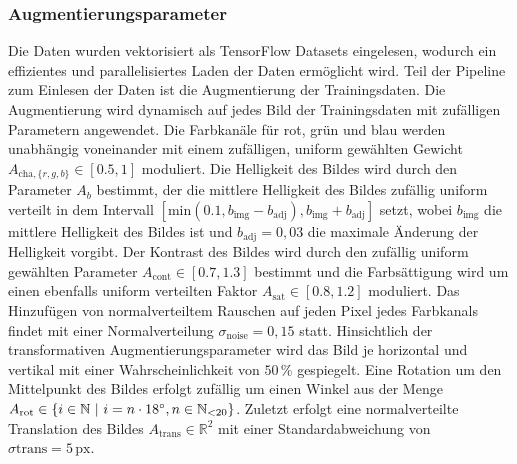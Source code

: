 \subsubsection{Augmentierungsparameter}

Die Daten wurden vektorisiert als TensorFlow Datasets eingelesen, wodurch ein effizientes und parallelisiertes Laden der Daten ermöglicht wird. Teil der Pipeline zum Einlesen der Daten ist die Augmentierung der Trainingsdaten. Die Augmentierung wird dynamisch auf jedes Bild der Trainingsdaten mit zufälligen Parametern angewendet. Die Farbkanäle für rot, grün und blau werden unabhängig voneinander mit einem zufälligen, uniform gewählten Gewicht $A_{\text{cha}, \{r,g,b\}} \in [0.5, 1]$ moduliert. Die Helligkeit des Bildes wird durch den Parameter $A_b$ bestimmt, der die mittlere Helligkeit des Bildes zufällig uniform verteilt in dem Intervall $[\text{min}(0.1, b_\text{img}-b_\text{adj}), b_\text{img} + b_\text{adj}]$ setzt, wobei $b_\text{img}$ die mittlere Helligkeit des Bildes ist und $b_\text{adj} = 0,03$ die maximale Änderung der Helligkeit vorgibt. Der Kontrast des Bildes wird durch den zufällig uniform gewählten Parameter $A_\text{cont} \in [0.7, 1.3]$ bestimmt und die Farbsättigung wird um einen ebenfalls uniform verteilten Faktor $A_\text{sat} \in [0.8, 1.2]$ moduliert. Das Hinzufügen von normalverteiltem Rauschen auf jeden Pixel jedes Farbkanals findet mit einer Normalverteilung $\sigma_\text{noise} = 0,15$ statt. Hinsichtlich der transformativen Augmentierungsparameter wird das Bild je horizontal und vertikal mit einer Wahrscheinlichkeit von $50\,\%$ gespiegelt. Eine Rotation um den Mittelpunkt des Bildes erfolgt zufällig um einen Winkel aus der Menge $A_\text{rot} \in \{i \in \mathbb{N} ~\vert~ i = n \cdot 18^{\circ}, n \in \mathbb{N}_{<20}\}$. Zuletzt erfolgt eine normalverteilte Translation des Bildes $A_\text{trans} \in \mathbb{R}^2$ mit einer Standardabweichung von $\sigma\text{trans} = 5\,\text{px}$.

